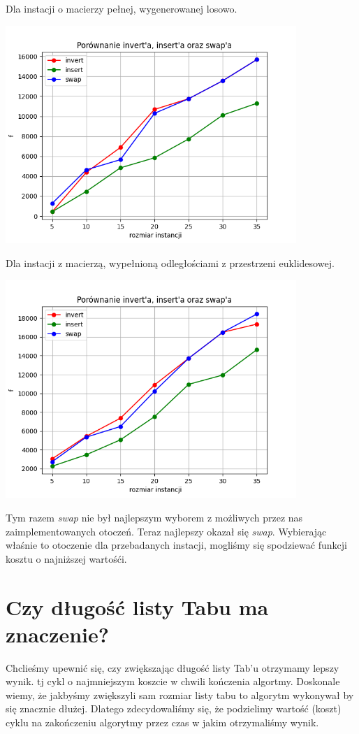 \documentclass{article}
\begin{document}
    Dla instacji o macierzy pełnej, wygenerowanej losowo.
    
    \includegraphics[width=11cm]{./spr2img/Figure_5.png}

    Dla instacji z macierzą, wypełnioną odległościami z przestrzeni
    euklidesowej.

    \includegraphics[width=11cm]{./spr2img/Figure_2_EUC2D.png}

    Tym razem \emph{swap} nie był najlepszym wyborem z możliwych przez nas
    zaimplementowanych otoczeń. Teraz najlepszy okazał się \emph{swap}. 
    Wybierając właśnie to otoczenie dla przebadanych instacji, mogliśmy się
    spodziewać funkcji kosztu o najniższej wartośći.

    \section{Czy długość listy Tabu ma znaczenie? }

    Chclieśmy upewnić się, czy zwiększając długość listy
    Tab'u otrzymamy lepszy wynik. tj cykl o najmniejszym koszcie
    w chwili kończenia algortmy. Doskonale wiemy, że jakbyśmy
    zwiększyli sam rozmiar listy tabu to algorytm wykonywał by
    się znacznie dłużej. Dlatego zdecydowaliśmy się, że podzielimy
    wartość (koszt) cyklu na zakończeniu algorytmy przez czas w jakim
    otrzymaliśmy wynik.
\end{document}
